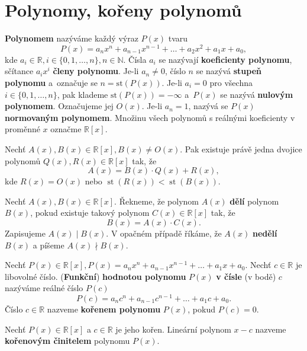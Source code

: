 \section{Polynomy, kořeny polynomů}
\begin{definition}
  \textbf{Polynomem} nazýváme každý výraz $P(x)$ tvaru
  \[
    P(x)=a_nx^n + a_{n-1}x^{n-1}+\dots + a_2x^2+a_1x+a_0,
  \]
  kde $a_i\in \mathbb R, i\in \{ 0,1,\dots , n \},n\in \mathbb N$. Čísla $a_i$ se nazývají \textbf{koeficienty polynomu}, sčítance $a_ix^i$ \textbf{členy polynomu}.
  Je-li $a_n\ne 0$, číslo $n$ se nazývá \textbf{stupeň polynomu} a~označuje se $n= \text{st}(P(x))$.
  Je-li $a_i=0$ pro všechna $i \in \{ 0,1,\dots ,n\}$, pak klademe $\text{st}(P(x))=-\infty$ a~$P(x)$ se nazývá \textbf{nulovým polynomem}.
  Označujeme jej $O(x).$ Je-li $a_n=1$, nazývá se $P(x)$ \textbf{normovaným polynomem}. Množinu všech polynomů s reálnými koeficienty v proměnné $x$ označme $\mathbb R[x]$.
\end{definition}

\begin{veta}
  Nechť $A(x), B(x) \in \mathbb R[x],B(x) \ne O(x).$ Pak existuje právě jedna dvojice polynomů $Q(x),R(x)\in \mathbb R[x]$ tak, že
  \[
    A(x)=B(x)\cdot Q(x)+R(x),
  \]
  kde $R(x)=O(x)$ nebo $\operatorname{st}(R(x))<\operatorname{st}(B(x)).$
\end{veta}

\begin{definition}
  Nechť $A(x), B(x) \in \mathbb R[x]$. Řekneme, že polynom $A(x)$ \textbf{dělí} polynom $B(x)$, pokud existuje takový polynom $C(x) \in \mathbb R[x]$ tak, že
  \[
    B(x) = A(x)\cdot C(x).
  \]
  Zapisujeme $A(x) \mid B(x).$
  V opačném případě říkáme, že $A(x)$ \textbf{nedělí} $B(x)$ a píšeme $A(x) \nmid B(x)$.
\end{definition}

\begin{definition}
  Nechť $P(x)\in \mathbb R[x], P(x)=a_nx^n+a_{n-1}x^{n-1}+\dots +a_1x+a_0.$ Nechť $c\in \mathbb R$ je libovolné číslo. (\textbf{Funkční}) \textbf{hodnotou polynomu} $P(x)$ \textbf{v čísle} (v bodě) $c$ nazýváme reálné číslo $P(c)$
  \[
    P(c) = a_nc^n+a_{n-1}c^{n-1}+\dots+a_1c+a_0.
  \]
  Číslo $c\in \mathbb R$ nazveme \textbf{kořenem polynomu} $P(x)$, pokud $P(c) = 0$.
\end{definition}


\begin{definition}
  Nechť $P(x) \in \mathbb R [x]$ a $c\in \mathbb R$ je jeho kořen. Lineární polynom $x-c$ nazveme \textbf{kořenovým činitelem} polynomu $P(x)$.
\end{definition}

